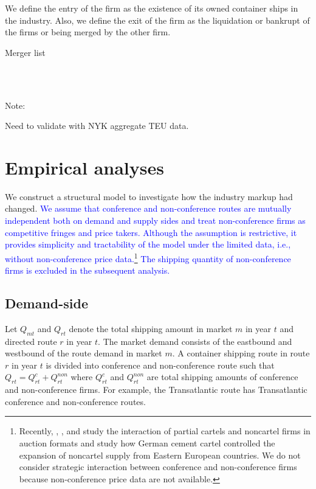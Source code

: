 \documentclass[10pt]{article}
\begin{document}
We define the entry of the firm as the existence of its owned container ships in the industry. 
Also, we define the exit of the firm as the liquidation or bankrupt of the firms or being merged by the other firm. 

\begin{table}[!htbp]
  \begin{center}
      \caption{Merger list}
      \label{tb:merger_list_CIY} 
      \subfloat[CIY (1966-1990)]{}\\
      \subfloat[IHS (1991-2005)]{}\\
      \subfloat[HB (2005-2022)]{}
  \end{center}\footnotesize
  Note: 
\end{table} 

Need to validate with NYK aggregate TEU data.

\section{Empirical analyses}\label{sec:empirical_analyses}
We construct a structural model to investigate how the industry markup had changed. 
\textcolor{blue}{
We assume that conference and non-conference routes are mutually independent both on demand and supply sides and treat non-conference firms as competitive fringes and price takers. Although the assumption is restrictive, it provides simplicity and tractability of the model under the limited data, i.e., without non-conference price data.\footnote{Recently, \cite{clark2018bid},  \cite{gabrielli2020assessment}, and
\cite{caoui2022study} study the interaction of partial cartels and noncartel firms in auction formats and \cite{harrington2018rent} study how German cement cartel controlled the expansion of noncartel supply from Eastern European countries. We do not consider strategic interaction between conference and non-conference firms because non-conference price data are not available.} The shipping quantity of non-conference firms is excluded in the subsequent analysis.
}

\subsection{Demand-side}
Let $Q_{mt}$ and $Q_{rt}$ denote the total shipping amount in market $m$ in year $t$ and directed route $r$ in year $t$. The market demand consists of the eastbound and westbound of the route demand in market $m$. A container shipping route in route $r$ in year $t$ is divided into conference and non-conference route such that 
$Q_{rt}=Q_{rt}^{c}+Q_{rt}^{non}$ where $Q_{rt}^{c}$ and $Q_{rt}^{non}$ are total shipping amounts of conference and non-conference firms. For example, the Transatlantic route has Transatlantic conference and non-conference routes. 
\end{document}
